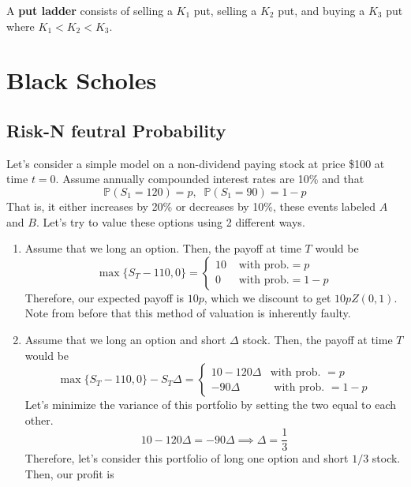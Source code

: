\documentclass{article}
\begin{document}
    \begin{definition}
      A \textbf{put ladder} consists of selling a $K_1$ put, selling a $K_2$ put, and buying a $K_3$ put where $K_1 < K_2 < K_3$. 
    \end{definition}

\section{Black Scholes}

  \subsection{Risk-N feutral Probability}

    Let's consider a simple model on a non-dividend paying stock at price \$100 at time $t = 0$. Assume annually compounded interest rates are 10\% and that 
    \begin{equation}
      \mathbb{P}(S_1 = 120) = p, \;\; \mathbb{P}(S_1 = 90) = 1 - p
    \end{equation}
    That is, it either increases by 20\% or decreases by 10\%, these events labeled $A$ and $B$. Let's try to value these options using 2 different ways. 
    \begin{enumerate}
      \item Assume that we long an option. Then, the payoff at time $T$ would be 
        \begin{equation}
          \max\{S_T - 110, 0\} = \begin{cases}
            10 & \text{ with prob.} = p \\ 
            0 & \text{ with prob.} = 1 - p 
          \end{cases} 
        \end{equation}
        Therefore, our expected payoff is $10p$, which we discount to get $10p Z(0, 1)$. Note from before that this method of valuation is inherently faulty. 

      \item Assume that we long an option and short $\Delta$ stock. Then, the payoff at time $T$ would be 
        \begin{equation}
          \max\{S_T - 110, 0\} - S_T \Delta = \begin{cases} 
            10 - 120 \Delta & \text{with prob. } = p  \\ 
            - 90\Delta & \text{ with prob. } = 1 - p
          \end{cases} 
        \end{equation}
        Let's minimize the variance of this portfolio by setting the two equal to each other. 
        \begin{equation}
          10 - 120 \Delta = -90 \Delta \implies \Delta = \frac{1}{3}
        \end{equation}
        Therefore, let's consider this portfolio of long one option and short $1/3$ stock. Then, our profit is 
    \end{enumerate}
\end{document}
